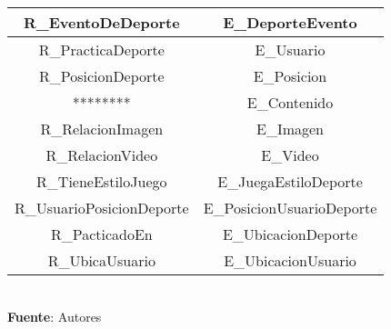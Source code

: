 \begin{table}[!htb]
\begin{center}
{\begin{tabular}{|p{4cm}|p{4cm}|p{4cm}|p{4cm}|}
			\hline
			\multicolumn{2}{|c|}{R_EventoDeDeporte} & 
			\multicolumn{2}{c|}{E_DeporteEvento} \\
			\hline
			\multicolumn{2}{|c|}{R_PracticaDeporte} & 
			\multicolumn{2}{c|}{E_Usuario} \\
			\hline
			\multicolumn{2}{|c|}{R_PosicionDeporte} & 
			\multicolumn{2}{c|}{E_Posicion} \\
			\hline
			\multicolumn{2}{|c|}{********} & 
			\multicolumn{2}{c|}{E_Contenido} \\
			\hline
			\multicolumn{2}{|c|}{R_RelacionImagen} & 
			\multicolumn{2}{c|}{E_Imagen} \\
			\hline
			\multicolumn{2}{|c|}{R_RelacionVideo} & 
			\multicolumn{2}{c|}{E_Video} \\
			\hline
			\multicolumn{2}{|c|}{R_TieneEstiloJuego} & 
			\multicolumn{2}{c|}{E_JuegaEstiloDeporte} \\
			\hline
			\multicolumn{2}{|c|}{R_UsuarioPosicionDeporte} & 
			\multicolumn{2}{c|}{E_PosicionUsuarioDeporte} \\
			\hline
			\multicolumn{2}{|c|}{R_PacticadoEn} & 
			\multicolumn{2}{c|}{E_UbicacionDeporte} \\
			\hline
			\multicolumn{2}{|c|}{R_UbicaUsuario} & 
			\multicolumn{2}{c|}{E_UbicacionUsuario} \\
			\hline
		\end{tabular}
		} \\
		\textbf{Fuente}: Autores
	\end{center}
\end{table}